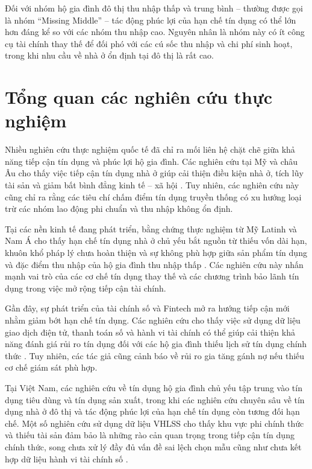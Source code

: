 \documentclass[12pt,a4paper]{report}
\begin{document}
	Đối với nhóm hộ gia đình đô thị thu nhập thấp và trung bình – thường được gọi là nhóm ``Missing Middle'' – tác động phúc lợi của hạn chế tín dụng có thể lớn hơn đáng kể so với các nhóm thu nhập cao. Nguyên nhân là nhóm này có ít công cụ tài chính thay thế để đối phó với các cú sốc thu nhập và chi phí sinh hoạt, trong khi nhu cầu về nhà ở ổn định tại đô thị là rất cao.
	
	\section{Tổng quan các nghiên cứu thực nghiệm}
	
	Nhiều nghiên cứu thực nghiệm quốc tế đã chỉ ra mối liên hệ chặt chẽ giữa khả năng tiếp cận tín dụng và phúc lợi hộ gia đình. Các nghiên cứu tại Mỹ và châu Âu cho thấy việc tiếp cận tín dụng nhà ở giúp cải thiện điều kiện nhà ở, tích lũy tài sản và giảm bất bình đẳng kinh tế – xã hội \parencite{urban2024Barriers,policydebate2025_equity}. Tuy nhiên, các nghiên cứu này cũng chỉ ra rằng các tiêu chí chấm điểm tín dụng truyền thống có xu hướng loại trừ các nhóm lao động phi chuẩn và thu nhập không ổn định.
	
	Tại các nền kinh tế đang phát triển, bằng chứng thực nghiệm từ Mỹ Latinh và Nam Á cho thấy hạn chế tín dụng nhà ở chủ yếu bắt nguồn từ thiếu vốn dài hạn, khuôn khổ pháp lý chưa hoàn thiện và sự không phù hợp giữa sản phẩm tín dụng và đặc điểm thu nhập của hộ gia đình thu nhập thấp \parencite{arrieta2005Mortgage,sharma2024saving}. Các nghiên cứu này nhấn mạnh vai trò của các cơ chế tín dụng thay thế và các chương trình bảo lãnh tín dụng trong việc mở rộng tiếp cận tài chính.
	
	Gần đây, sự phát triển của tài chính số và Fintech mở ra hướng tiếp cận mới nhằm giảm bớt hạn chế tín dụng. Các nghiên cứu cho thấy việc sử dụng dữ liệu giao dịch điện tử, thanh toán số và hành vi tài chính có thể giúp cải thiện khả năng đánh giá rủi ro tín dụng đối với các hộ gia đình thiếu lịch sử tín dụng chính thức \parencite{yue2022digital}. Tuy nhiên, các tác giả cũng cảnh báo về rủi ro gia tăng gánh nợ nếu thiếu cơ chế giám sát phù hợp.
	
	Tại Việt Nam, các nghiên cứu về tín dụng hộ gia đình chủ yếu tập trung vào tín dụng tiêu dùng và tín dụng sản xuất, trong khi các nghiên cứu chuyên sâu về tín dụng nhà ở đô thị và tác động phúc lợi của hạn chế tín dụng còn tương đối hạn chế. Một số nghiên cứu sử dụng dữ liệu VHLSS cho thấy khu vực phi chính thức và thiếu tài sản đảm bảo là những rào cản quan trọng trong tiếp cận tín dụng chính thức, song chưa xử lý đầy đủ vấn đề sai lệch chọn mẫu cũng như chưa kết hợp dữ liệu hành vi tài chính số \parencite{sbv2023HousingFinanceVN,tapchinganhang2023NOXH}.
	
\end{document}
